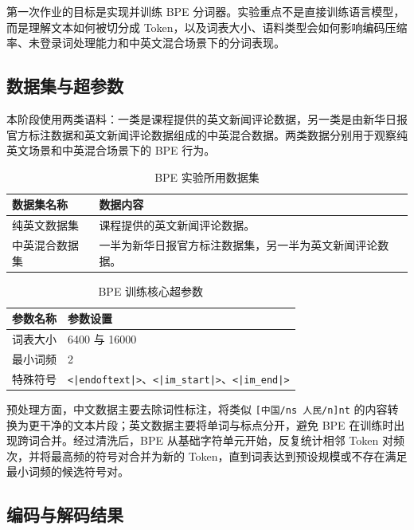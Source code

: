 \documentclass[a4paper,12pt]{ctexart}
\begin{document}
第一次作业的目标是实现并训练 BPE 分词器。实验重点不是直接训练语言模型，而是理解文本如何被切分成 Token，以及词表大小、语料类型会如何影响编码压缩率、未登录词处理能力和中英文混合场景下的分词表现。

\subsection{数据集与超参数}

本阶段使用两类语料：一类是课程提供的英文新闻评论数据，另一类是由新华日报官方标注数据和英文新闻评论数据组成的中英混合数据。两类数据分别用于观察纯英文场景和中英混合场景下的 BPE 行为。

\begin{table}[H]
    \centering
    \begin{tabularx}{\textwidth}{L{0.24\textwidth}Y}
        \toprule
        数据集名称 & 数据内容 \\
        \midrule
        纯英文数据集 & 课程提供的英文新闻评论数据。 \\
        中英混合数据集 & 一半为新华日报官方标注数据集，另一半为英文新闻评论数据。 \\
        \bottomrule
    \end{tabularx}
    \caption{BPE 实验所用数据集}
\end{table}

\begin{table}[H]
    \centering
    \begin{tabularx}{\textwidth}{L{0.30\textwidth}Y}
        \toprule
        参数名称 & 参数设置 \\
        \midrule
        词表大小 & 6400 与 16000 \\
        最小词频 & 2 \\
        特殊符号 & \texttt{<|endoftext|>}、\texttt{<|im\_start|>}、\texttt{<|im\_end|>} \\
        \bottomrule
    \end{tabularx}
    \caption{BPE 训练核心超参数}
\end{table}

预处理方面，中文数据主要去除词性标注，将类似 \texttt{[中国/ns 人民/n]nt} 的内容转换为更干净的文本片段；英文数据主要将单词与标点分开，避免 BPE 在训练时出现跨词合并。经过清洗后，BPE 从基础字符单元开始，反复统计相邻 Token 对频次，并将最高频的符号对合并为新的 Token，直到词表达到预设规模或不存在满足最小词频的候选符号对。

\subsection{编码与解码结果}
\end{document}
